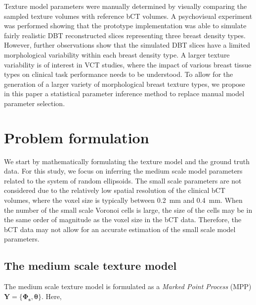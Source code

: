 \documentclass[journal]{IEEEtran}
\begin{document}
Texture model parameters were manually determined by visually
comparing the sampled texture volumes with reference bCT volumes. A
psychovisual experiment was performed showing that the prototype
implementation was able to simulate fairly realistic DBT reconstructed
slices representing three breast density types. However, further
observations show that the simulated DBT slices have a limited
morphological variability within each breast density type. A larger
texture variability is of interest in VCT studies, where the impact of
various breast tissue types on clinical task performance needs to be
understood. To allow for the generation of a larger variety of
morphological breast texture types, we propose in this paper a
statistical parameter inference method to replace manual model
parameter selection.


\section{Problem formulation}
\label{sec:problem-formulation}

We start by mathematically formulating the texture model and the
ground truth data. For this study, we focus on inferring the medium
scale model parameters related to the system of random ellipsoids. The
small scale parameters are not considered due to the relatively low
spatial resolution of the clinical bCT volumes, where the voxel size
is typically between \SI{0.2}{\mm} and \SI{0.4}{\mm}. When the number
of the small scale Voronoi cells is large, the size of the cells may
be in the same order of magnitude as the voxel size in the bCT
data. Therefore, the bCT data may not allow for an accurate estimation
of the small scale model parameters.

\subsection{The medium scale texture model}
\label{sec:medium-scale-texture}

The medium scale texture model is formulated as a \textit{Marked Point
  Process} (MPP) \cite{chiu2013stochastic}
$\mathbf{Y} = \{ \mathbf{\Phi_{s}},\boldsymbol{\theta} \}$. Here,
\end{document}

